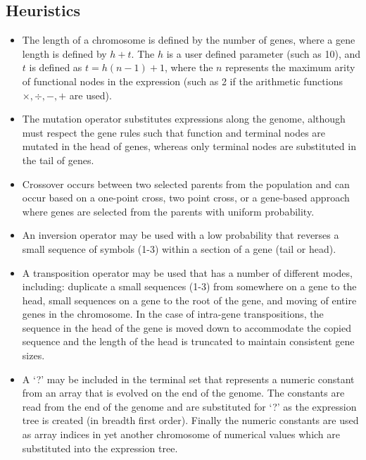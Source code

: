 \subsection{Heuristics}
\begin{itemize}
	\item The length of a chromosome is defined by the number of genes, where a gene length is defined by $h + t$. The $h$ is a user defined parameter (such as 10), and $t$ is defined as $t = h (n-1) + 1$, where the $n$ represents the maximum arity of functional nodes in the expression (such as 2 if the arithmetic functions $\times, \div, -, +$ are used).
	\item The mutation operator substitutes expressions along the genome, although must respect the gene rules such that function and terminal nodes are mutated in the head of genes, whereas only terminal nodes are substituted in the tail of genes.
	\item Crossover occurs between two selected parents from the population and can occur based on a one-point cross, two point cross, or a gene-based approach where genes are selected from the parents with uniform probability.
	\item An inversion operator may be used with a low probability that reverses a small sequence of symbols (1-3) within a section of a gene (tail or head). 
	\item A transposition operator may be used that has a number of different modes, including: duplicate a small sequences (1-3) from somewhere on a gene to the head, small sequences on a gene to the root of the gene, and moving of entire genes in the chromosome. In the case of intra-gene transpositions, the sequence in the head of the gene is moved down to accommodate the copied sequence and the length of the head is truncated to maintain consistent gene sizes.
	\item A `?' may be included in the terminal set that represents a numeric constant from an array that is evolved on the end of the genome. The constants are read from the end of the genome and are substituted for `?' as the expression tree is created (in breadth first order). Finally the numeric constants are used as array indices in yet another chromosome of numerical values which are substituted into the expression tree.

\end{itemize}
